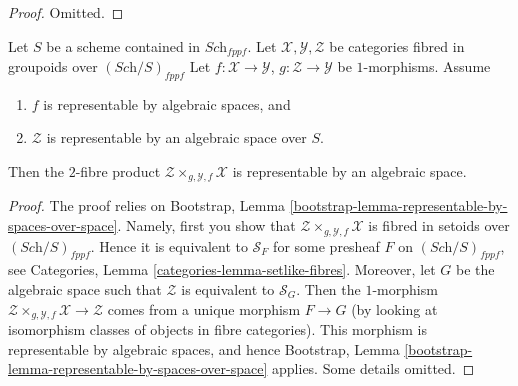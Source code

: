\begin{proof}
Omitted.
\end{proof}

\begin{lemma}
\label{lemma-base-change-by-space-representable-by-space}
Let $S$ be a scheme contained in $\textit{Sch}_{fppf}$.
Let $\mathcal{X}, \mathcal{Y}, \mathcal{Z}$
be categories fibred in groupoids over $(\textit{Sch}/S)_{fppf}$
Let $f : \mathcal{X} \to \mathcal{Y}$,
$g : \mathcal{Z} \to \mathcal{Y}$ be $1$-morphisms.
Assume
\begin{enumerate}
\item $f$ is representable by algebraic spaces, and
\item $\mathcal{Z}$ is representable by an algebraic space over $S$.
\end{enumerate}
Then the $2$-fibre product
$\mathcal{Z} \times_{g, \mathcal{Y}, f} \mathcal{X}$
is representable by an algebraic space.
\end{lemma}

\begin{proof}
The proof relies on
Bootstrap, Lemma \ref{bootstrap-lemma-representable-by-spaces-over-space}.
Namely, first you show that
$\mathcal{Z} \times_{g, \mathcal{Y}, f} \mathcal{X}$
is fibred in setoids over $(\textit{Sch}/S)_{fppf}$.
Hence it is equivalent to $\mathcal{S}_F$ for some presheaf
$F$ on $(\textit{Sch}/S)_{fppf}$, see
Categories, Lemma \ref{categories-lemma-setlike-fibres}.
Moreover, let $G$ be the algebraic space such that
$\mathcal{Z}$ is equivalent to $\mathcal{S}_G$. Then the
$1$-morphism
$\mathcal{Z} \times_{g, \mathcal{Y}, f} \mathcal{X} \to \mathcal{Z}$
comes from a unique morphism $F \to G$ (by looking at isomorphism
classes of objects in fibre categories). This morphism is representable
by algebraic spaces, and hence 
Bootstrap, Lemma \ref{bootstrap-lemma-representable-by-spaces-over-space}
applies. Some details omitted.
\end{proof}

